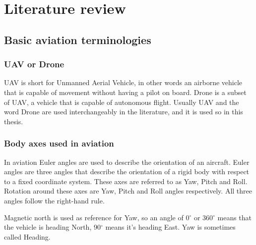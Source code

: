 \chapter{Literature review}

\section{Basic aviation terminologies}

\subsection{UAV or Drone}
UAV is short for Unmanned Aerial Vehicle, in other words an airborne vehicle that is capable of movement
without having a pilot on board. Drone is a subset of UAV, a vehicle that is capable of autonomous flight.
Usually UAV and the word Drone are used interchangeably in the literature, and it is used so in this thesis.

\subsection{Body axes used in aviation}
In aviation Euler angles are used to describe the orientation of an aircraft. Euler angles are three angles
that describe the orientation of a rigid body with respect to a fixed coordinate system. These axes are 
referred to as Yaw, Pitch and Roll. Rotation around these axes are Yaw, Pitch 
and Roll angles respectively. All three angles follow the right-hand rule. 

Magnetic north is used as reference for Yaw, so an angle of 0$^\circ$ or 360$^\circ$ means that the vehicle
is heading North, 90$^\circ$ means it's heading East. Yaw is sometimes called Heading.


